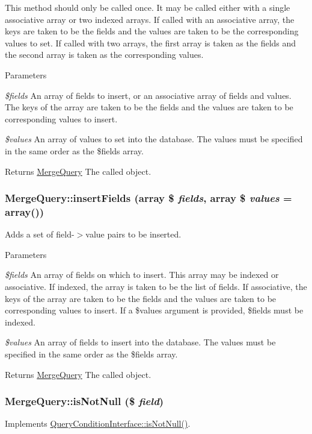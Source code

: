 This method should only be called once. It may be called either with a single associative array or two indexed arrays. If called with an associative array, the keys are taken to be the fields and the values are taken to be the corresponding values to set. If called with two arrays, the first array is taken as the fields and the second array is taken as the corresponding values.


\begin{DoxyParams}{Parameters}
\item[{\em \$fields}]An array of fields to insert, or an associative array of fields and values. The keys of the array are taken to be the fields and the values are taken to be corresponding values to insert. \item[{\em \$values}]An array of values to set into the database. The values must be specified in the same order as the \$fields array.\end{DoxyParams}
\begin{DoxyReturn}{Returns}
\hyperlink{classMergeQuery}{MergeQuery} The called object. 
\end{DoxyReturn}
\hypertarget{classMergeQuery_a1c1fef20258dad469a0853fdaddaae4e}{
\subsubsection[{insertFields}]{\setlength{\rightskip}{0pt plus 5cm}MergeQuery::insertFields (array \$ {\em fields}, \/  array \$ {\em values} = {\ttfamily array()})}}
\label{classMergeQuery_a1c1fef20258dad469a0853fdaddaae4e}
Adds a set of field-\/$>$value pairs to be inserted.


\begin{DoxyParams}{Parameters}
\item[{\em \$fields}]An array of fields on which to insert. This array may be indexed or associative. If indexed, the array is taken to be the list of fields. If associative, the keys of the array are taken to be the fields and the values are taken to be corresponding values to insert. If a \$values argument is provided, \$fields must be indexed. \item[{\em \$values}]An array of fields to insert into the database. The values must be specified in the same order as the \$fields array.\end{DoxyParams}
\begin{DoxyReturn}{Returns}
\hyperlink{classMergeQuery}{MergeQuery} The called object. 
\end{DoxyReturn}
\hypertarget{classMergeQuery_a6eda0759442dcb9cfa940e5ced5cc7ba}{
\subsubsection[{isNotNull}]{\setlength{\rightskip}{0pt plus 5cm}MergeQuery::isNotNull (\$ {\em field})}}
\label{classMergeQuery_a6eda0759442dcb9cfa940e5ced5cc7ba}
Implements \hyperlink{interfaceQueryConditionInterface_a8bbb6acc9c72911b165cf6eb1dc31453}{QueryConditionInterface::isNotNull()}. 

